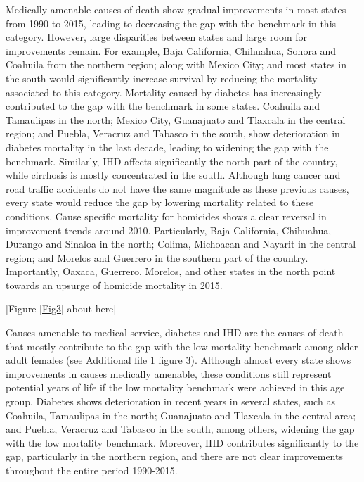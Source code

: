 \documentclass{bmcart}
\begin{document}
Medically amenable causes of death show gradual improvements in most states from 1990 to 2015, leading to decreasing the gap with the benchmark in this category. However, large disparities between states and large room for improvements remain. For example, Baja California, Chihuahua, Sonora and Coahuila from the northern region; along with Mexico City; and most states in the south would significantly increase survival by reducing the mortality associated to this category. Mortality caused by diabetes has increasingly contributed to the gap with the benchmark in some states. Coahuila and Tamaulipas in the north; Mexico City, Guanajuato and Tlaxcala in the central region; and Puebla, Veracruz and Tabasco in the south, show deterioration in diabetes mortality in the last decade, leading to widening the gap with the benchmark. Similarly, IHD affects significantly the north part of the country, while cirrhosis is mostly concentrated in the south. Although lung cancer and road traffic accidents do not have the same magnitude as these previous causes, every state would reduce the gap by lowering mortality related to these conditions. Cause specific mortality for homicides shows a clear reversal in improvement trends around 2010. Particularly, Baja California, Chihuahua, Durango and Sinaloa in the north; Colima, Michoacan and Nayarit in the central region; and Morelos and Guerrero in the southern part of the country. Importantly, Oaxaca, Guerrero, Morelos, and other states in the north point towards an upsurge of homicide mortality in 2015. 

\begin{center}
[Figure \ref{Fig3} about here]
\end{center}

Causes amenable to medical service, diabetes and IHD are the causes of death that mostly contribute to the gap with the low mortality benchmark among older adult females (see Additional file 1 figure 3). Although almost every state shows improvements in causes medically amenable, these conditions still represent potential years of life if the low mortality benchmark were achieved in this age group. Diabetes shows deterioration in recent years in several states, such as Coahuila, Tamaulipas in the north; Guanajuato and Tlaxcala in the central area; and Puebla, Veracruz and Tabasco in the south, among others, widening the gap with the low mortality benchmark. Moreover, IHD contributes significantly to the gap, particularly in the northern region, and there are not clear improvements throughout the entire period 1990-2015.
\end{document}
